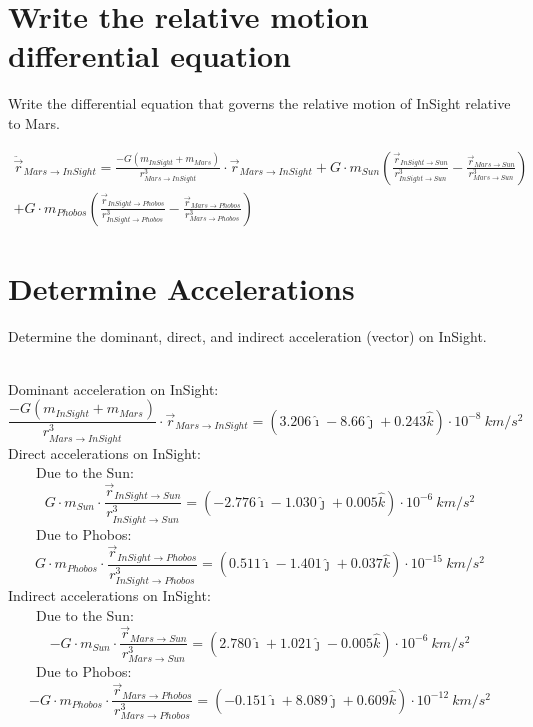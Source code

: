 \documentclass[hidelinks,12pt]{article}
\begin{document}
\begin{flushleft}
\section{Write the relative motion differential equation}
\begin{large}
  Write the differential equation that governs the relative motion of InSight relative to Mars.
\end{large}
\begin{multline}
  \ddot{\vec{r}}_{Mars \to InSight} = \frac{-G(m_{InSight} + m_{Mars})}{r^3_{Mars \to InSight}} \cdot \vec{r}_{Mars \to InSight} + G \cdot m_{Sun}(\frac{\vec{r}_{InSight \to Sun}}{r^3_{InSight \to Sun}} - \frac{\vec{r}_{Mars \to Sun}}{r^3_{Mars \to Sun}}) \\
  + G \cdot m_{Phobos}(\frac{\vec{r}_{InSight \to Phobos}}{r^3_{InSight \to Phobos}} - \frac{\vec{r}_{Mars \to Phobos}}{r^3_{Mars \to Phobos}})
\end{multline}

\section{Determine Accelerations}
\begin{large}
  Determine the dominant, direct, and indirect acceleration (vector) on InSight.
\end{large}\\
\vspace{5px}
Dominant acceleration on InSight:
\begin{equation} \label{eq:DomAcc}
  \frac{-G(m_{InSight} + m_{Mars})}{r^3_{Mars \to InSight}} \cdot \vec{r}_{Mars \to InSight} = (3.206 \hat{\imath} -8.66 \hat{\jmath} + 0.243 \hat{k}) \cdot 10^{-8}~km/s^2
\end{equation}
Direct accelerations on InSight:\\
~~~~Due to the Sun:\\
\begin{equation}
  G \cdot m_{Sun} \cdot \frac{\vec{r}_{InSight \to Sun}}{r^3_{InSight \to Sun}}
  = (-2.776 \hat{\imath} -1.030 \hat{\jmath} + 0.005\hat{k}) \cdot 10^{-6}~km/s^2
\end{equation}
~~~~Due to Phobos:
\begin{equation}
  G \cdot m_{Phobos} \cdot \frac{\vec{r}_{InSight \to Phobos}}{r^3_{InSight \to Phobos}} = (0.511 \hat{\imath} -1.401 \hat{\jmath} + 0.037\hat{k}) \cdot 10^{-15}~km/s^2
\end{equation}
Indirect accelerations on InSight:\\
~~~~Due to the Sun:\\
  \begin{equation}
    -G \cdot m_{Sun} \cdot \frac{\vec{r}_{Mars \to Sun}}{r^3_{Mars \to Sun}}
    = (2.780 \hat{\imath} + 1.021 \hat{\jmath} - 0.005\hat{k}) \cdot 10^{-6}~km/s^2
  \end{equation}
~~~~Due to Phobos:
  \begin{equation} \label{eq:IndirPhobos}
    -G \cdot m_{Phobos} \cdot \frac{\vec{r}_{Mars \to Phobos}}{r^3_{Mars \to Phobos}} = (-0.151 \hat{\imath} + 8.089 \hat{\jmath} + 0.609\hat{k}) \cdot 10^{-12}~km/s^2
  \end{equation}

\end{flushleft}
\end{document}
